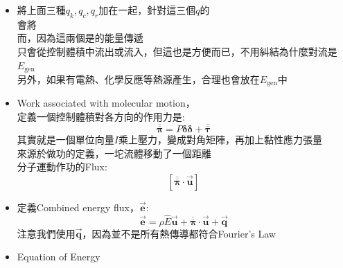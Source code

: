 \documentclass[../main.tex]{subfiles}
\begin{document}
\begin{itemize}
\begin{itemize}
        但當然你還是能把他們全部併入$h$，所以才說$h$很雜\\
        P.S. Rosseland Model假設在流體非常稠(光學無法透視)的情況下\\
        熱輻射可以近似成熱傳導的一種形式
        \begin{equation}
          \vec{\bm q}_r \approx -\frac{16\sigma T^3}{3k_{\text{abs}}}\nabla T
        \end{equation}
        $k_{\text{abs}}$是Absorption Coefficient，代表流體對輻射的吸收能力\\
        這樣就可以把熱輻射也塞入Governing Equation中了
      \item 將上面三種$q_k,q_c,q_r$加在一起，針對這三個$q$的\\
      會將\\
      而，因為這兩個是的能量傳遞\\
      只會從控制體積中流出或流入，但這也是方便而已，不用糾結為什麼對流是$E_{\text{gen}}$\\
      另外，如果有電熱、化學反應等熱源產生，合理也會放在$E_{\text{gen}}$中
      \item Work associated with molecular motion，\\
        定義一個控制體積對各方向的作用力是:
        \begin{equation}
          \overline{\overline{\bm \pi}} = P{\bm \delta\bm \delta} + \overline{\overline{\bm \tau}}
        \end{equation}
        其實就是一個單位向量$I$乘上壓力，變成對角矩陣，再加上黏性應力張量\\
        來源於做功的定義，一坨流體移動了一個距離\\
        分子運動作功的Flux:
        \begin{equation}
          \left[\overline{\overline{\bm \pi}} \cdot \vec{\bm u}\right]
        \end{equation}
      \item 定義Combined energy flux，$\vec{\bm e}$:
        \begin{equation}
          \vec{\bm e} = \rho \hat E \vec{\bm u} + \overline{\overline{\bm \pi}} \cdot \vec{\bm u}  + \vec{\bm q}
          \label{eq:energy_flux_definition}
        \end{equation}
        注意我們使用$\vec{\bm q}$，因為並不是所有熱傳導都符合Fourier's Law
      \item Equation of Energy\\

\end{itemize}
\end{itemize}
\end{document}
